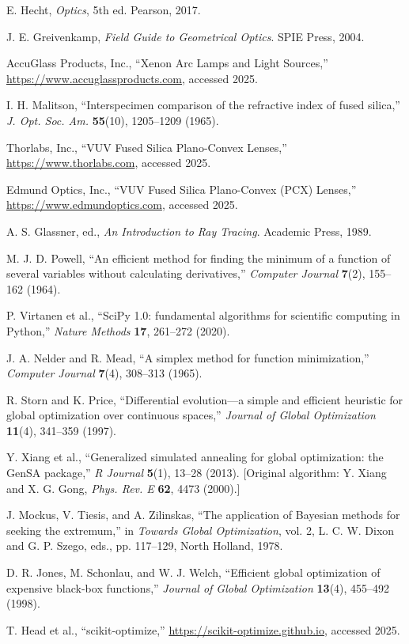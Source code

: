 \begin{thebibliography}{99}

E. Hecht, \textit{Optics}, 5th ed. Pearson, 2017.

J. E. Greivenkamp, \textit{Field Guide to Geometrical Optics}. SPIE Press, 2004.

AccuGlass Products, Inc., ``Xenon Arc Lamps and Light Sources,'' \url{https://www.accuglassproducts.com}, accessed 2025.

I. H. Malitson, ``Interspecimen comparison of the refractive index of fused silica,'' \textit{J. Opt. Soc. Am.} \textbf{55}(10), 1205--1209 (1965).

Thorlabs, Inc., ``VUV Fused Silica Plano-Convex Lenses,'' \url{https://www.thorlabs.com}, accessed 2025.

Edmund Optics, Inc., ``VUV Fused Silica Plano-Convex (PCX) Lenses,'' \url{https://www.edmundoptics.com}, accessed 2025.

A. S. Glassner, ed., \textit{An Introduction to Ray Tracing}. Academic Press, 1989.

M. J. D. Powell, ``An efficient method for finding the minimum of a function of several variables without calculating derivatives,'' \textit{Computer Journal} \textbf{7}(2), 155--162 (1964).

P. Virtanen et al., ``SciPy 1.0: fundamental algorithms for scientific computing in Python,'' \textit{Nature Methods} \textbf{17}, 261--272 (2020).

J. A. Nelder and R. Mead, ``A simplex method for function minimization,'' \textit{Computer Journal} \textbf{7}(4), 308--313 (1965).

R. Storn and K. Price, ``Differential evolution—a simple and efficient heuristic for global optimization over continuous spaces,'' \textit{Journal of Global Optimization} \textbf{11}(4), 341--359 (1997).

Y. Xiang et al., ``Generalized simulated annealing for global optimization: the GenSA package,'' \textit{R Journal} \textbf{5}(1), 13--28 (2013). [Original algorithm: Y. Xiang and X. G. Gong, \textit{Phys. Rev. E} \textbf{62}, 4473 (2000).]

J. Mockus, V. Tiesis, and A. Zilinskas, ``The application of Bayesian methods for seeking the extremum,'' in \textit{Towards Global Optimization}, vol. 2, L. C. W. Dixon and G. P. Szego, eds., pp. 117--129, North Holland, 1978.

D. R. Jones, M. Schonlau, and W. J. Welch, ``Efficient global optimization of expensive black-box functions,'' \textit{Journal of Global Optimization} \textbf{13}(4), 455--492 (1998).

T. Head et al., ``scikit-optimize,'' \url{https://scikit-optimize.github.io}, accessed 2025.

\end{thebibliography}



